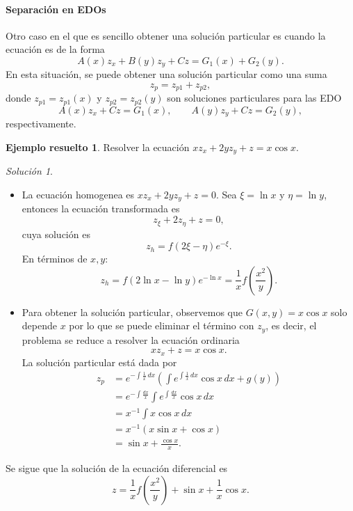 \documentclass[11pt,letterpaper,draft]{report}
\theoremstyle{plain}
\theoremstyle{definition}
\newtheorem{solved}[theorem]{Ejemplo resuelto}
\theoremstyle{remark}
\newtheorem*{solution}{Solución}
\newcommand\<{\langle}
\renewcommand\>{\rangle}
\begin{document}
\paragraph{Separación en EDOs}
Otro caso en el que es sencillo obtener una solución particular es
cuando la ecuación es de la forma
\begin{equation}
  A(x)z_x + B(y)z_y + Cz = G_1(x) + G_2(y)
.\end{equation}
En esta situación, se puede obtener una solución particular como una
suma
\begin{equation}
  z_p = z_{p1}+z_{p2}
,\end{equation}
donde \(z_{p1}=z_{p 1}(x)\) y \(z_{p 2}=z_{p 2}(y)\) son soluciones
particulares para las EDO
\begin{equation}
  A(x)z_x + Cz = G_1(x),
  \qquad
  A(y)z_y + Cz = G_2(y),
\end{equation}
respectivamente.

\begin{solved}
  Resolver la ecuación $x z_x + 2y z_y + z = x\cos x$.
  \begin{solution}
    \begin{itemize}
      \item La ecuación homogenea es $xz_x+2yz_y + z=0$. Sea
        $\xi = \ln x$ y $\eta = \ln y$, entonces la ecuación
        transformada es
        \[
          z_\xi + 2z_\eta + z = 0,
        \] 
        cuya solución es
        \[
          z_h = f(2\xi - \eta)e^{-\xi}.
        \] 
        En términos de $x,y$:
        \[
        z_h = f(2\ln x - \ln y)e^{-\ln x} = \frac{1}{x}
        f\left(\frac{x^2}{y}\right).
        \] 
      \item Para obtener la solución particular, observemos
        que $G(x,y) = x \cos x$ solo depende $x$ por lo que
        se puede eliminar el término con $z_y$, es decir, el
        problema se reduce a resolver la ecuación ordinaria
        \[
        x z_x + z = x\cos x.
        \] 
        La solución particular está dada por
        \begin{align*}
          z_p &= e^{-\int \frac{1}{x}\, dx} \left(\int
            e^{\int \frac{1}{x} \, dx} \cos x \, dx +
            g(y)\right)\\
              &= e^{-\int \frac{dx}{x}} \int e^{\int
              \frac{dx}{x}} \cos x \, dx\\
              &= x^{-1} \int x\cos x \, dx\\
              &= x^{-1}\left(x\sin x + \cos x\right)\\
              &= \sin x + \frac{\cos x}{x}.
        \end{align*}
    \end{itemize}
    Se sigue que la solución de la ecuación diferencial es
    \[
    z = \frac{1}{x}f\left(\frac{x^2}{y}\right) + \sin x +
      \frac{1}{x} \cos x.
    \] 
  \end{solution}
\end{solved}
\end{document}
